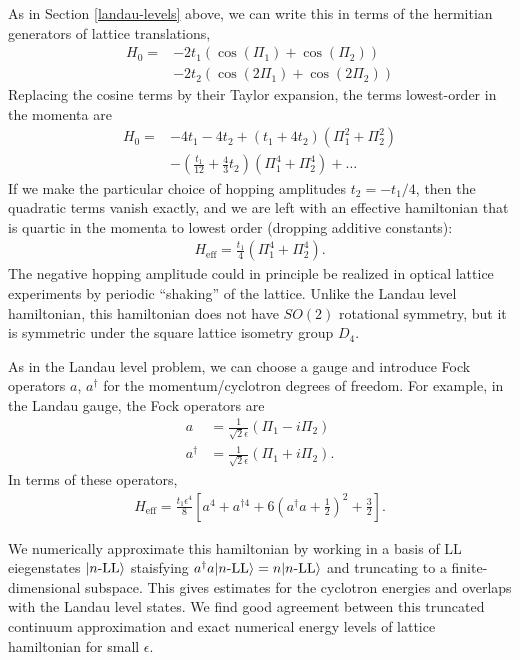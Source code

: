 \documentclass[aps,prb,twocolumn,letterpaper,twoside,nobalancelastpage,groupedaddress,amsmath,amssymb,floatfix,citeautoscript]{revtex4-1}
\begin{document}
As in Section \ref{landau-levels} above, we can write this in terms of the hermitian generators of lattice translations,
\begin{align*}
H_0 = &-2t_1\left(\cos(\Pi_1) + \cos(\Pi_2)\right)\\ &- 2t_2\left(\cos(2\Pi_1) + \cos(2\Pi_2)\right)
\end{align*}
Replacing the cosine terms by their Taylor expansion, the terms lowest-order in the momenta are 
\begin{align*}
H_0 = &-4 t_1 - 4 t_2 + (t_1 + 4t_2) \left(\Pi_1^2 + \Pi_2^2\right) \\
&- \left(\frac{t_1}{12} + \frac{4}{3}t_2\right) \left(\Pi_1^4 + \Pi_2^4\right) + \ldots
\end{align*}
If we make the particular choice of hopping amplitudes $t_2 = -t_1/4$, then the quadratic terms vanish exactly, and we are left with an effective hamiltonian that is quartic in the momenta to lowest order (dropping additive constants):
\begin{align}
\label{hamiltonian-quartic-effective}
H_{\text{eff}} = \frac{t_1}{4} \left(\Pi_1^4 + \Pi_2^4\right).
\end{align}
The negative hopping amplitude could in principle be realized in optical lattice experiments by periodic ``shaking'' of the lattice. Unlike the Landau level hamiltonian, this hamiltonian does not have $SO(2)$ rotational symmetry, but it is symmetric under the square lattice isometry group $D_4$. 

As in the Landau level problem, we can choose a gauge and introduce Fock operators $a$, $a^{\dag}$ for the momentum/cyclotron degrees of freedom. For example, in the Landau gauge, the Fock operators are
\begin{align*}
a &= \frac{1}{\sqrt{2}\epsilon}\left(\Pi_1 - i\Pi_2\right)\\
a^{\dag} &= \frac{1}{\sqrt{2}\epsilon}\left(\Pi_1 + i\Pi_2\right).
\end{align*}
In terms of these operators,
\begin{align*}
H_{\text{eff}} = \frac{t_1\epsilon^4}{8}\left[a^4 + a^{\dag 4} + 6\left(a^{\dag}a + \frac{1}{2}\right)^2 + \frac{3}{2}\right].
\end{align*}

We numerically approximate this hamiltonian by working in a basis of LL eiegenstates ${\ket{n\text{-LL}}}$ staisfying $a^{\dag}a{\ket{n\text{-LL}}}=n{\ket{n\text{-LL}}}$ and truncating to a finite-dimensional subspace. This gives estimates for the cyclotron energies and overlaps with the Landau level states. We find good agreement between this truncated continuum approximation and exact numerical energy levels of lattice hamiltonian for small $\epsilon$.
\end{document}
